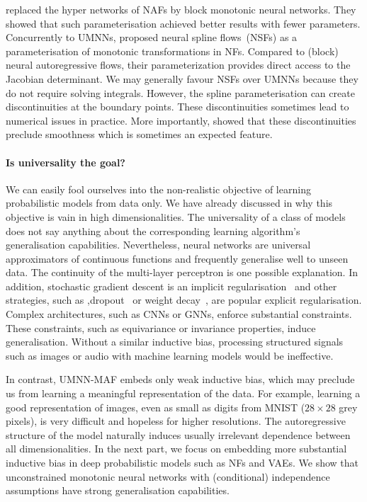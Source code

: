 \citet{de_cao_block_2020} replaced the hyper networks of NAFs by block monotonic neural networks. They showed that such parameterisation achieved better results with fewer parameters. Concurrently to UMNNs, \citet{durkan_neural_2019} proposed neural spline flows~(NSFs) as a parameterisation of monotonic transformations in NFs. Compared to (block) neural autoregressive flows, their parameterization provides direct access to the Jacobian determinant. We may generally favour NSFs over UMNNs because they do not require solving integrals. However, the spline parameterisation can create discontinuities at the boundary points. These discontinuities sometimes lead to numerical issues in practice. More importantly, \citet{kohler2021smooth} showed that these discontinuities preclude smoothness which is sometimes an expected feature.


\paragraph{Is universality the goal?}
We can easily fool ourselves into the non-realistic objective of learning probabilistic models from data only. We have already discussed in  why this objective is vain in high dimensionalities. The universality of a class of models does not say anything about the corresponding learning algorithm's generalisation capabilities. Nevertheless, neural networks are universal approximators of continuous functions and frequently generalise well to unseen data. The continuity of the multi-layer perceptron is one possible explanation.
In addition, stochastic gradient descent is an implicit regularisation~\citep{smith2021origin, barrett2020implicit} and other strategies, such as ,dropout~\citep{srivastava2014dropout} or weight decay~\citep{krogh1991simple}, are popular explicit regularisation. Complex architectures, such as CNNs or GNNs, enforce substantial constraints. These constraints, such as equivariance or invariance properties, induce generalisation. Without a similar inductive bias, processing structured signals such as images or audio with machine learning models would be ineffective.

In contrast, UMNN-MAF embeds only weak inductive bias, which may preclude us from learning a meaningful representation of the data. For example, learning a good representation of images, even as small as digits from MNIST ($28 \times 28$ grey pixels), is very difficult and hopeless for higher resolutions. The autoregressive structure of the model naturally induces usually irrelevant dependence between all dimensionalities. In the next part, we focus on embedding more substantial inductive bias in deep probabilistic models such as NFs and VAEs. We show that unconstrained monotonic neural networks with (conditional) independence assumptions have strong generalisation capabilities.

